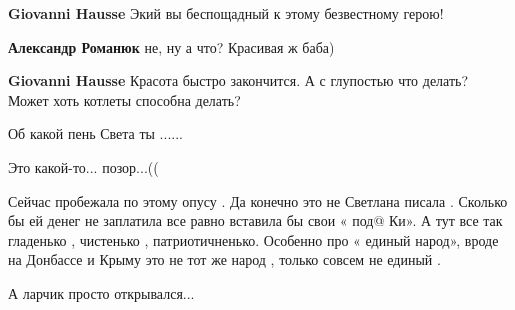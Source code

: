 \begin{itemize}
\begin{itemize}
\textbf{Giovanni Hausse} Экий вы беспощадный к этому безвестному герою!

 
\textbf{Александр Романюк} не, ну а что? Красивая ж баба)

 
\textbf{Giovanni Hausse} Красота быстро закончится. А с глупостью что делать? Может хоть котлеты способна делать?
\end{itemize}

 
Об какой пень Света ты ......

 
Это какой-то... позор...((

 
Сейчас пробежала по этому опусу . Да конечно это не Светлана писала . Сколько бы ей денег не заплатила все равно вставила бы свои « под@ Ки». А тут все так гладенько , чистенько , патриотичненько. Особенно про « единый народ», вроде на Донбассе и Крыму это не тот же народ , только совсем не единый .

 
А ларчик просто открывался...


\end{itemize}
